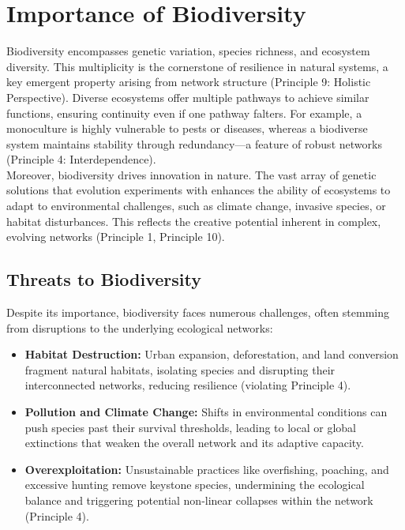 \documentclass[12pt,openany]{book}
\begin{document}
\section{Importance of Biodiversity}
Biodiversity encompasses genetic variation, species richness, and ecosystem diversity. This multiplicity is the cornerstone of resilience in natural systems, a key emergent property arising from network structure (Principle 9: Holistic Perspective). Diverse ecosystems offer multiple pathways to achieve similar functions, ensuring continuity even if one pathway falters. For example, a monoculture is highly vulnerable to pests or diseases, whereas a biodiverse system maintains stability through redundancy—a feature of robust networks (Principle 4: Interdependence).\\[1ex]
Moreover, biodiversity drives innovation in nature. The vast array of genetic solutions that evolution experiments with enhances the ability of ecosystems to adapt to environmental challenges, such as climate change, invasive species, or habitat disturbances. This reflects the creative potential inherent in complex, evolving networks (Principle 1, Principle 10). %

\subsection{Threats to Biodiversity}
Despite its importance, biodiversity faces numerous challenges, often stemming from disruptions to the underlying ecological networks:
\begin{itemize}
    \item \textbf{Habitat Destruction:} Urban expansion, deforestation, and land conversion fragment natural habitats, isolating species and disrupting their interconnected networks, reducing resilience (violating Principle 4).
    \item \textbf{Pollution and Climate Change:} Shifts in environmental conditions can push species past their survival thresholds, leading to local or global extinctions that weaken the overall network and its adaptive capacity.
    \item \textbf{Overexploitation:} Unsustainable practices like overfishing, poaching, and excessive hunting remove keystone species, undermining the ecological balance and triggering potential non-linear collapses within the network (Principle 4).
\end{itemize} %
\end{document}
